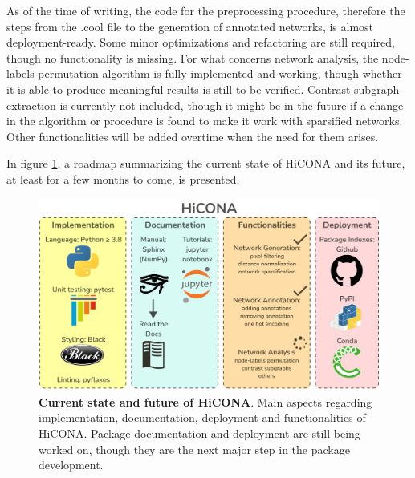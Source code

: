 As of the time of writing, the code for the preprocessing procedure, therefore the steps from the .cool file to the generation of annotated networks, is almost deployment-ready. Some minor optimizations and refactoring are still required, though no functionality is missing. For what concerns network analysis, the node-labels permutation algorithm is fully implemented and working, though whether it is able to produce meaningful results is still to be verified. Contrast subgraph extraction is currently not included, though it might be in the future if a change in the algorithm or procedure is found to make it work with sparsified networks. Other functionalities will be added overtime when the need for them arises.

In figure \ref{fig:roadmap}, a roadmap summarizing the current state of HiCONA and its future, at least for a few months to come, is presented.

\begin{figure}[ht]
  \centering
  \includegraphics[width=1\textwidth]{roadmap.png}
  \caption{\textbf{Current state and future of HiCONA}. Main aspects regarding implementation, documentation, deployment and functionalities of HiCONA. Package documentation and deployment are still being worked on, though they are the next major step in the package development.}
  \label{fig:roadmap}
\end{figure}
